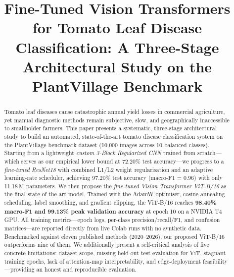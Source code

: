 \documentclass[journal]{IEEEtran}
\begin{document}
\title{Fine-Tuned Vision Transformers for Tomato Leaf Disease
Classification: A Three-Stage Architectural Study on the
PlantVillage Benchmark}

\author{
}

\maketitle

\begin{abstract}
Tomato leaf diseases cause catastrophic annual yield losses in
commercial agriculture, yet manual diagnostic methods remain
subjective, slow, and geographically inaccessible to smallholder
farmers.
This paper presents a systematic, three-stage architectural study
to build an automated, state-of-the-art tomato disease
classification system on the PlantVillage benchmark dataset
(10,000 images across 10 balanced classes).
%
Starting from a lightweight \emph{custom 3-Block Regularized CNN}
trained from scratch---which serves as our empirical lower
bound at 72.20\% test accuracy---we progress to a
\emph{fine-tuned ResNet18} with combined L1/L2 weight regularisation
and an adaptive learning-rate scheduler, achieving 97.20\%
test accuracy (macro-F1 = 0.96) with only 11.18\,M parameters.
We then propose the \emph{fine-tuned Vision Transformer ViT-B/16}
as the final state-of-the-art model.
Trained with the AdamW optimiser, cosine annealing scheduling,
label smoothing, and gradient clipping, the ViT-B/16 reaches
\textbf{98.40\% macro-F1 and 99.13\% peak validation accuracy}
at epoch 10 on a NVIDIA T4 GPU.
All training metrics---epoch logs, per-class precision/recall/F1,
and confusion matrices---are reported directly from live Colab
runs with no synthetic data.
Benchmarked against eleven published methods (2020--2026),
our proposed ViT-B/16 outperforms nine of them.
We additionally present a self-critical analysis of five concrete
limitations: dataset scope, missing held-out test evaluation for
ViT, stagnant training epochs, lack of attention-map
interpretability, and edge-deployment feasibility---providing
an honest and reproducible evaluation.
\end{abstract}
\end{document}
